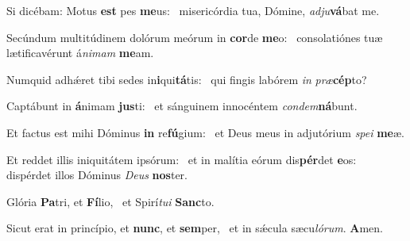 \item Si dicébam: Motus \textbf{est} pes \textbf{me}us:~\psstar{} misericórdia tua, Dómine, \textit{adju}\textbf{vá}bat me.
\item Secúndum multitúdinem dolórum meórum in \textbf{cor}de \textbf{me}o:~\psstar{} consolatiónes tuæ lætificavérunt á\textit{nimam} \textbf{me}am.
\item Numquid adhǽret tibi sedes in\textbf{i}qui\textbf{tá}tis:~\psstar{} qui fingis labórem \textit{in} \textit{præ}\textbf{cép}to?
\item Captábunt in \textbf{á}nimam \textbf{jus}ti:~\psstar{} et sánguinem innocéntem \textit{condem}\textbf{ná}bunt.
\item Et factus est mihi Dóminus \textbf{in} re\textbf{fú}gium:~\psstar{} et Deus meus in adjutórium \textit{spei} \textbf{me}æ.
\item Et reddet illis iniquitátem ipsórum:~\pscross{} et in malítia eórum dis\textbf{pér}det \textbf{e}os:~\psstar{} dispérdet illos Dóminus \textit{Deus} \textbf{nos}ter.
\item Glória \textbf{Pa}tri, et \textbf{Fí}lio,~\psstar{} et Spirí\textit{tui} \textbf{Sanc}to.
\item Sicut erat in princípio, et \textbf{nunc}, et \textbf{sem}per,~\psstar{} et in sǽcula sæcu\textit{lórum}. \textbf{A}men.
